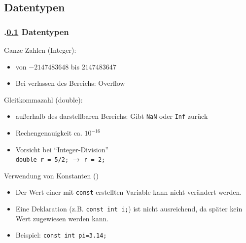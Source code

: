 \def\stitle{Datentypen}%
\subsection{\stitle}\label{S:type}
\begin{frame}[t]%
  \frametitle{\kap.\ref{S:type} \stitle }%
\medskip
Ganze Zahlen (Integer): \\
\begin{itemize}
  \item von $-2147483648$ bis $2147483647$
  \item Bei verlassen des Bereichs: Overflow
\end{itemize}
\medskip
Gleitkommazahl (double): \\
\begin{itemize}
 \item au\ss erhalb des darstellbaren Bereichs: Gibt \lstinline|NaN| oder \lstinline|Inf| zur\"uck
 \item Rechengenauigkeit ca. $10^{-16}$
 \item Vorsicht bei "`Integer-Division"'\\
 \lstinline|double r = 5/2;| $\rightarrow$ \lstinline|r = 2;|
\end{itemize}
\medskip
Verwendung von Konstanten ()
\begin{itemize}
  \item Der Wert einer mit \lstinline|const| erstellten Variable kann nicht ver\"andert werden.
  \item Eine Deklaration (z.B. \lstinline|const int i;|) ist nicht ausreichend, da sp\"ater kein Wert zugewiesen werden kann.
  \item Beispiel: \lstinline|const int pi=3.14;|
\end{itemize}
\end{frame}
